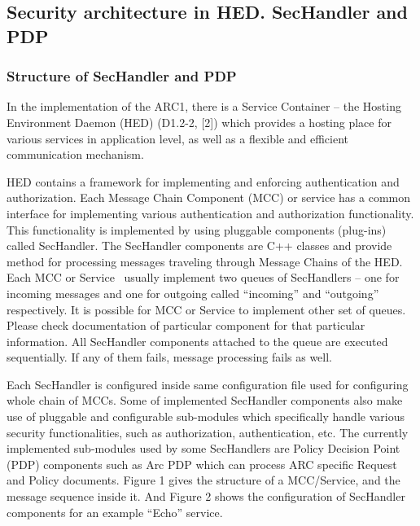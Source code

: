 \documentclass{article}
\newcounter{Figure}
\begin{document}
\bigskip

\subsection{Security architecture in HED. SecHandler and PDP}
\subsubsection{Structure of SecHandler and PDP}
{\upshape\color{black}
In the implementation of the ARC1, there is a Service Container -- the
Hosting Environment Daemon (HED) (D1.2-2, [2]) which provides a hosting
place for various services in application level, as well as a flexible
and efficient communication mechanism.}

{\upshape\color{black}
HED contains a framework for implementing and enforcing authentication
and authorization. Each Message Chain Component (MCC) or service has a
common interface for implementing various authentication and
authorization functionality. This functionality is implemented by using
pluggable components (plug-ins) called SecHandler. The SecHandler
components are C++ classes and provide method for processing messages
traveling through Message Chains of the HED. Each MCC or Service
\ usually implement two queues of SecHandlers -- one for incoming
messages and one for outgoing called
{\textquotedblleft}incoming{\textquotedblright} and
{\textquotedblleft}outgoing{\textquotedblright} respectively. It is
possible for MCC or Service to implement other set of queues. Please
check documentation of particular component for that particular
information. All SecHandler components attached to the queue are
executed sequentially. If any of them fails, message processing fails
as well.}

{\upshape\color{black}
Each SecHandler is configured inside same configuration file used for
configuring whole chain of MCCs. Some of implemented SecHandler
components also make use of pluggable and configurable sub-modules
which specifically handle various security functionalities, such as
authorization, authentication, etc. The currently implemented
sub-modules used by some SecHandlers are Policy Decision Point (PDP)
components such as Arc PDP which can process ARC specific Request and
Policy documents. Figure 1 gives the structure of a MCC/Service, and
the message sequence inside it. And Figure 2 shows the configuration of
SecHandler components for an example
{\textquotedblleft}Echo{\textquotedblright} service.}
\end{document}
